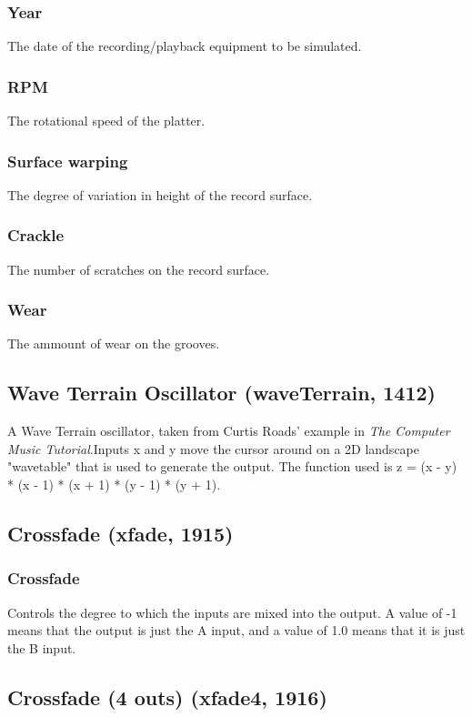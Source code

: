 \documentclass[11pt]{article}
\begin{document}
\subsubsection*{Year}
The date of the recording/playback equipment to be simulated.\subsubsection*{RPM}
The rotational speed of the platter.\subsubsection*{Surface warping}
The degree of variation in height of the record surface.\subsubsection*{Crackle}
The number of scratches on the record surface.\subsubsection*{Wear}
The ammount of wear on the grooves.\subsection{Wave Terrain Oscillator (waveTerrain, 1412)\label{waveTerrain}\label{id1412}}
A Wave Terrain oscillator, taken from Curtis Roads' example in {\em The Computer Music Tutorial}.Inputs x and y move the cursor around on a 2D landscape "wavetable" that is used to generate the output. The function used is  z = (x - y) * (x - 1) * (x + 1) * (y - 1) * (y + 1).\subsection{Crossfade (xfade, 1915)\label{xfade}\label{id1915}}
\subsubsection*{Crossfade}
Controls the degree to which the inputs are mixed into the output. A
value of -1 means that the output is just the A input, and a value of 1.0
means that it is just the B input.\subsection{Crossfade (4 outs) (xfade4, 1916)\label{xfade4}\label{id1916}}
\end{document}
